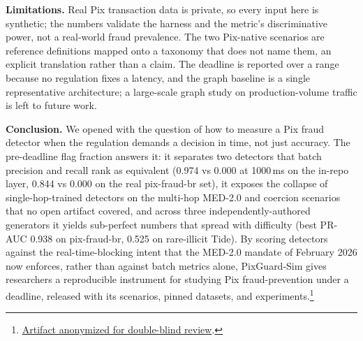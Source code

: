\documentclass[12pt]{article}
\newcommand{\sysname}{PixGuard-Sim\xspace}
\newcommand{\rfPre}{0.974}        %
\newcommand{\gbPreThousand}{0.000} %
\newcommand{\PfbXgbPRAUC}{0.938}   %
\newcommand{\PfbXgbPre}{0.844}
\newcommand{\PfbGbPre}{0.000}
\newcommand{\TideHiXgbPRAUC}{0.525} %
\begin{document}
\noindent\textbf{Limitations.} Real Pix transaction data is private, so every
input here is synthetic; the numbers validate the harness and the metric's
discriminative power, not a real-world fraud prevalence. The two Pix-native
scenarios are reference definitions mapped onto a taxonomy that does not name
them, an explicit translation rather than a claim. The deadline is reported over
a range because no regulation fixes a latency, and the graph baseline is a
single representative architecture; a large-scale graph study on
production-volume traffic is left to future work.

\noindent\textbf{Conclusion.} We opened with the question of how to measure a
Pix fraud detector when the regulation demands a decision in time, not just
accuracy. The pre-deadline flag fraction answers it: it separates two detectors
that batch precision and recall rank as equivalent (\rfPre{} vs \gbPreThousand{}
at 1000\,ms on the in-repo layer, \PfbXgbPre{} vs \PfbGbPre{} on the real
pix-fraud-br set), it exposes the collapse of single-hop-trained detectors on
the multi-hop MED-2.0 and coercion scenarios that no open artifact covered, and
across three independently-authored generators it yields sub-perfect numbers
that spread with difficulty (best PR-AUC \PfbXgbPRAUC{} on pix-fraud-br,
\TideHiXgbPRAUC{} on rare-illicit Tide). By scoring detectors against the
real-time-blocking intent that the MED-2.0 mandate of February 2026 now
enforces, rather than against batch metrics alone, \sysname{} gives researchers
a reproducible instrument for studying Pix fraud-prevention under a deadline,
released with its scenarios, pinned datasets, and
experiments.\footnote{\href{https://anonymous.4open.science/}{Artifact anonymized for double-blind review}.}



\end{document}
